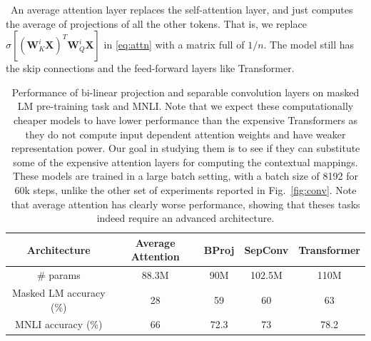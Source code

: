 \documentclass{article} %
\def\mW{{\bm{W}}}
\def\mX{{\bm{X}}}
\newcommand{\sfmx}{\sigma}
\begin{document}
~An average attention layer replaces the self-attention layer, and just computes the average of projections of all the other tokens. That is, we replace $\sfmx [(\mW_K^i \mX)^T \mW_Q^i \mX]$ in \eqref{eq:attn} with a matrix full of $1/n$. The model still has the skip connections and the feed-forward layers like Transformer. 

\begin{table}[!t]
\centering
\begin{tabular}{|c| c c c c|} 
 \hline
 Architecture & Average Attention & {\rm BProj} & {\rm SepConv} & Transformer \\ [0.5ex] 
 \hline
  \# params & 88.3M & 90M  & 102.5M & 110M \\
 \hline
 Masked LM accuracy (\%)& 28 & 59 & 60 & 63 \\
 \hline
 MNLI accuracy (\%)& 66 & 72.3 & 73 & 78.2 \\
 \hline
\end{tabular}
\vspace{1ex}
\caption{Performance of bi-linear projection and separable convolution layers on masked LM pre-training task and MNLI. Note that we expect these computationally cheaper models to have lower performance than the expensive Transformers as they do not compute input dependent attention weights and have weaker representation power. Our goal in studying them is to see if they can substitute some of the expensive attention layers for computing the contextual mappings. These models are trained in a large batch setting, with a batch size of 8192 for 60k steps, unlike the other set of experiments reported in Fig.~\ref{fig:conv}. Note that average attention has clearly worse performance, showing that theses tasks indeed require an advanced architecture.}
\label{table:large_batch}
\end{table}
\end{document}
